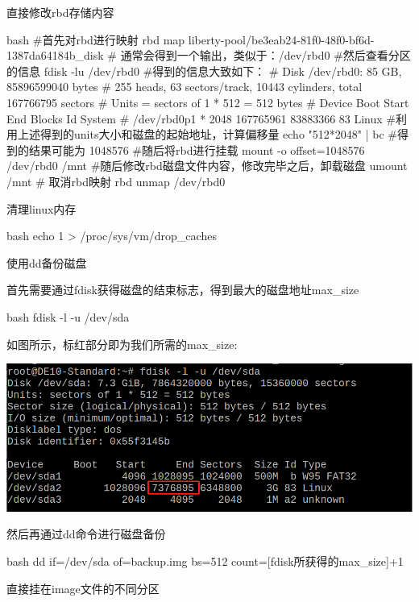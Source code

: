 \begin{outline}[enumerate]
\1 直接修改rbd存储内容
\begin{code-block}{bash}
#首先对rbd进行映射
rbd map liberty-pool/be3eab24-81f0-48f0-bf6d-1387da64184b_disk
# 通常会得到一个输出，类似于：/dev/rbd0
#然后查看分区的信息
fdisk -lu /dev/rbd0
#得到的信息大致如下：
# Disk /dev/rbd0: 85 GB, 85896599040 bytes
# 255 heads, 63 sectors/track, 10443 cylinders, total 167766795 sectors
# Units = sectors of 1 * 512 = 512 bytes
#     Device Boot      Start         End      Blocks   Id  System
# /dev/rbd0p1   *        2048   167765961    83883366   83  Linux
#利用上述得到的units大小和磁盘的起始地址，计算偏移量
echo "512*2048" | bc
#得到的结果可能为 1048576
#随后将rbd进行挂载
mount -o offset=1048576 /dev/rbd0 /mnt
#随后修改rbd磁盘文件内容，修改完毕之后，卸载磁盘
umount /mnt
# 取消rbd映射
rbd unmap /dev/rbd0
\end{code-block}

\1 清理linux内存
\begin{code-block}{bash}
echo 1 > /proc/sys/vm/drop_caches
\end{code-block}

\1 使用dd备份磁盘

首先需要通过fdisk获得磁盘的结束标志，得到最大的磁盘地址max\_size
\begin{code-block}{bash}
fdisk -l -u /dev/sda
\end{code-block}

如图所示，标红部分即为我们所需的max\_size:
\par\begin{minipage}{\linewidth}
  \centering
  \includegraphics[width=\linewidth]{backup.png}
  \label{fig:backup}
\end{minipage}

然后再通过dd命令进行磁盘备份
\begin{code-block}{bash}
dd if=/dev/sda of=backup.img bs=512 count=[fdisk所获得的max_size]+1
\end{code-block}

\1 直接挂在image文件的不同分区


\end{outline}
